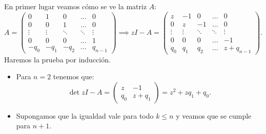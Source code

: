 \documentclass[10pt]{article}
\begin{document}
\begin{plist}
\item En primer lugar veamos cómo se ve la matriz \(A\):
\[
    A =
    \begin{pmatrix}
    0 & 1 & 0 & \dots & 0\\
    0 & 0 & 1 & \dots & 0\\
    \vdots & \vdots & \ddots & \ddots & \vdots\\
    0 & 0 & 0 & \dots & 1\\
    -q_0 & -q_1 & -q_2 & \dots & q_{n-1}
    \end{pmatrix}
    \implies
    zI - A
    =
    \begin{pmatrix}
    z & -1 & 0 & \dots & 0\\
    0 & z & -1 & \dots & 0\\
    \vdots & \vdots & \ddots & \ddots & \vdots\\
    0 & 0 & 0 & \dots & -1\\
    q_0 & q_1 & q_2 & \dots & z+q_{n-1}
    \end{pmatrix}
.\]
Haremos la prueba por inducción.

\begin{itemize}
    \item Para \(n = 2\) tenemos que:
    \[
        \det zI - A
        =
        \begin{pmatrix}
        z & -1\\
        q_0 & z + q_1
        \end{pmatrix}
        =
        z^2 + z q_1 + q_0
    .\]

    \item Supongamos que la igualdad vale para todo \(k\le n\) y veamos que se
    cumple para \(n+1\).


\end{itemize}
\end{plist}
\end{document}
